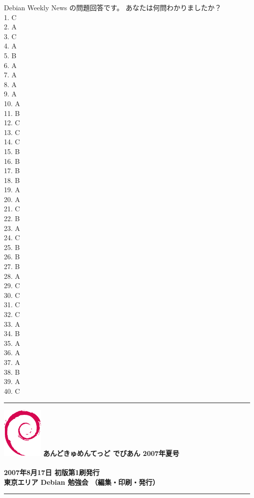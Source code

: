 \documentclass[mingoth,a4paper]{jsarticle}
\begin{document}
\begin{multicols}{2}
 Debian Weekly News の問題回答です。
 あなたは何問わかりましたか？
 \\
 1. C\\
 2. A\\
 3. C\\
 4. A\\
 5. B\\
 6. A\\
 7. A\\
 8. A\\
 9. A\\
 10. A\\
 11. B\\
 12. C\\
 13. C\\
 14. C\\
 15. B\\
 16. B\\
 17. B\\
 18. B\\
 19. A\\
 20. A\\
 21. C\\
 22. B\\
 23. A\\
 24. C\\
 25. B\\
 26. B\\
 27. B\\
 28. A\\
 29. C\\
 30. C\\
 31. C\\
 32. C\\
 33. A\\
 34. B\\
 35. A\\
 36. A\\
 37. A\\
 38. B\\
 39. A\\
 40. C\\

\end{multicols}

\cleartooddpage

\vspace*{15cm}
\hrule
\vspace{2mm}
\includegraphics[width=2cm]{image200502/openlogo-nd.eps}
\noindent \Large \bf あんどきゅめんてっど でびあん 2007年夏号\\ \\
\noindent \normalfont 2007年8月17日 \hspace{5mm}  初版第1刷発行\\
\noindent \normalfont 東京エリア Debian 勉強会 （編集・印刷・発行）\\
\hrule
\end{document}
